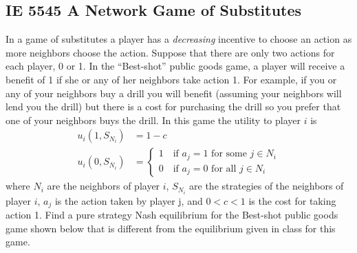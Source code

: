\documentclass{article}
\begin{document}
\subsection{IE 5545 A Network Game of Substitutes}
In a game of substitutes a player has a \emph{decreasing} incentive to choose an action as
more neighbors choose the action. Suppose that there are only two actions for each player,
0 or 1. In the ``Best-shot'' public goods game, a player will receive a benefit
of 1 if she or any of her neighbors take action 1. For example, if you or any of your
neighbors buy a drill you will benefit (assuming your neighbors will lend you the drill)
but there is a cost for purchasing the drill so you prefer that one of your neighbors
buys the drill. In this game the utility to player $i$ is
\begin{align*}
  u_i(1,S_{N_i}) &= 1 - c\\
  u_i(0,S_{N_i}) &= \begin{cases}
    1 \quad \text{if $a_j=1$ for some $j \in N_i$}\\
    0 \quad \text{if $a_j=0$ for all $j \in N_i$}
    \end{cases}
\end{align*}
where $N_i$ are the neighbors of player $i$, $S_{N_i}$ are the
strategies of the neighbors of player $i$, $a_j$ is the action taken
by player j, and $0 < c < 1$ is the cost for taking action 1.  Find a
pure strategy Nash equilibrium for the Best-shot public goods game
shown below that is different from the equilibrium given in class for
this game.

\vspace{.5in}
\begin{center}
%
\end{center}
\end{document}
